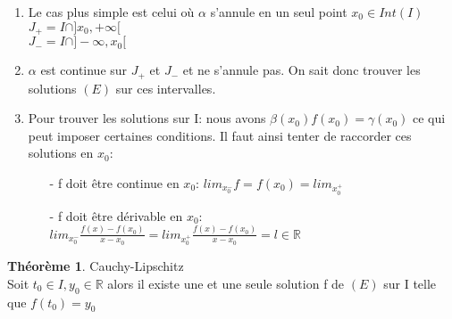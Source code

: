 \documentclass[fleqn]{article}
\theoremstyle{definition} \newtheorem*{defi}{D\'efinition}
\theoremstyle{definition} \newtheorem*{theo}{Th\'eor\`eme}
\theoremstyle{remark} \newtheorem*{rqs}{Remarques}
\begin{document}
\begin{enumerate}
\begin{enumerate}
			\item Le cas plus simple est celui o\`u $\alpha$ s'annule en un seul point $x_0 \in Int(I)$\\
				$J_+ = I \cap ]x_0, +\infty[$\\
				$J_- = I \cap ]-\infty, x_0[$
			\item $\alpha$ est continue sur $J_+$ et $J_-$ et ne s'annule pas. On sait donc trouver les solutions $(E)$ sur ces intervalles.
			\item Pour trouver les solutions sur I: nous avons $\beta(x_0)f(x_0) = \gamma(x_0)$ ce qui peut imposer certaines conditions.
				Il faut ainsi tenter de raccorder ces solutions en $x_0$:
				\begin{itemize}
					\item [-] f doit \^etre continue en $x_0$: $lim_{x_0^-} f = f(x_0) = lim_{x_0^+}$
					\item [-] f doit \^etre d\'erivable en $x_0$: $lim_{x_0^-} \frac{f(x) - f(x_0)}{x - x_0} = lim_{x_0^+} \frac{f(x) -
						f(x_0)}{x - x_0} = l \in \mathbb{R}$
				\end{itemize}
		\end{enumerate}
\end{enumerate}

\begin{theo} Cauchy-Lipschitz\\
	Soit $t_0 \in I, y_0 \in \mathbb{R}$ alors il existe une et une seule solution f de $(E)$ sur I telle que $f(t_0) = y_0$
\end{theo}
\end{document}
